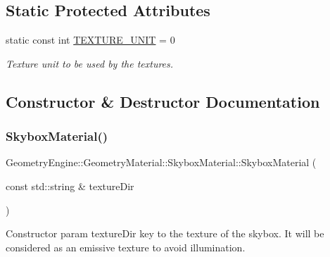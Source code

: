 \subsection*{Static Protected Attributes}
\begin{DoxyCompactItemize}
\item 
\mbox{\label{class_geometry_engine_1_1_geometry_material_1_1_skybox_material_a0cb45513a44851f20d3451aae3792aeb}} 
static const int \mbox{\hyperlink{class_geometry_engine_1_1_geometry_material_1_1_skybox_material_a0cb45513a44851f20d3451aae3792aeb}{T\+E\+X\+T\+U\+R\+E\+\_\+\+U\+N\+IT}} = 0
\begin{DoxyCompactList}\small\item\em Texture unit to be used by the textures. \end{DoxyCompactList}\end{DoxyCompactItemize}


\subsection{Constructor \& Destructor Documentation}
\mbox{\label{class_geometry_engine_1_1_geometry_material_1_1_skybox_material_a7cc6c7bb2246caad7f2eead65acb7bd8}} 
\subsubsection{\texorpdfstring{SkyboxMaterial()}{SkyboxMaterial()}\hspace{0.1cm}{\footnotesize\ttfamily [1/3]}}
{\footnotesize\ttfamily Geometry\+Engine\+::\+Geometry\+Material\+::\+Skybox\+Material\+::\+Skybox\+Material (\begin{DoxyParamCaption}\item[{const std\+::string \&}]{texture\+Dir }\end{DoxyParamCaption})}

Constructor param texture\+Dir key to the texture of the skybox. It will be considered as an emissive texture to avoid illumination. \mbox{\label{class_geometry_engine_1_1_geometry_material_1_1_skybox_material_a36e098e2d744596441ed450effcf8160}} 
